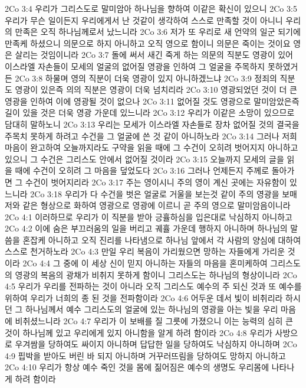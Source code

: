2Co 3:4  우리가 그리스도로 말미암아 하나님을 향하여 이같은 확신이 있으니
2Co 3:5  우리가 무슨 일이든지 우리에게서 난 것같이 생각하여 스스로 만족할 것이 아니니 우리의 만족은 오직 하나님께로서 났느니라
2Co 3:6  저가 또 우리로 새 언약의 일군 되기에 만족케 하셨으니 의문으로 하지 아니하고 오직 영으로 함이니 의문은 죽이는 것이요 영은 살리는 것임이니라
2Co 3:7  돌에 써서 새긴 죽게 하는 의문의 직분도 영광이 있어 이스라엘 자손들이 모세의 얼굴의 없어질 영광을 인하여 그 얼굴을 주목하지 못하였거든
2Co 3:8  하물며 영의 직분이 더욱 영광이 있지 아니하겠느냐
2Co 3:9  정죄의 직분도 영광이 있은즉 의의 직분은 영광이 더욱 넘치리라
2Co 3:10  영광되었던 것이 더 큰 영광을 인하여 이에 영광될 것이 없으나
2Co 3:11  없어질 것도 영광으로 말미암았은즉 길이 있을 것은 더욱 영광 가운데 있느니라
2Co 3:12  우리가 이같은 소망이 있으므로 담대히 말하노니
2Co 3:13  우리는 모세가 이스라엘 자손들로 장차 없어질 것의 결국을 주목치 못하게 하려고 수건을 그 얼굴에 쓴 것 같이 아니하노라
2Co 3:14  그러나 저희 마음이 완고하여 오늘까지라도 구약을 읽을 때에 그 수건이 오히려 벗어지지 아니하고 있으니 그 수건은 그리스도 안에서 없어질 것이라
2Co 3:15  오늘까지 모세의 글을 읽을 때에 수건이 오히려 그 마음을 덮었도다
2Co 3:16  그러나 언제든지 주께로 돌아가면 그 수건이 벗어지리라
2Co 3:17  주는 영이시니 주의 영이 계신 곳에는 자유함이 있느니라
2Co 3:18  우리가 다 수건을 벗은 얼굴로 거울을 보는것 같이 주의 영광을 보매 저와 같은 형상으로 화하여 영광으로 영광에 이르니 곧 주의 영으로 말미암음이니라
2Co 4:1  이러하므로 우리가 이 직분을 받아 긍휼하심을 입은대로 낙심하지 아니하고
2Co 4:2  이에 숨은 부끄러움의 일을 버리고 궤휼 가운데 행하지 아니하며 하나님의 말씀을 혼잡케 아니하고 오직 진리를 나타냄으로 하나님 앞에서 각 사람의 양심에 대하여 스스로 천거하노라
2Co 4:3  만일 우리 복음이 가리웠으면 망하는 자들에게 가리운 것이라
2Co 4:4  그 중에 이 세상 신이 믿지 아니하는 자들의 마음을 혼미케하여 그리스도의 영광의 복음의 광채가 비취지 못하게 함이니 그리스도는 하나님의 형상이니라
2Co 4:5  우리가 우리를 전파하는 것이 아니라 오직 그리스도 예수의 주 되신 것과 또 예수를 위하여 우리가 너희의 종 된 것을 전파함이라
2Co 4:6  어두운 데서 빛이 비취리라 하시던 그 하나님께서 예수 그리스도의 얼굴에 있는 하나님의 영광을 아는 빛을 우리 마음에 비취셨느니라
2Co 4:7  우리가 이 보배를 질 그릇에 가졌으니 이는 능력의 심히 큰 것이 하나님께 있고 우리에게 있지 아니함을 알게 하려 함이라
2Co 4:8  우리가 사방으로 우겨쌈을 당하여도 싸이지 아니하며 답답한 일을 당하여도 낙심하지 아니하며
2Co 4:9  핍박을 받아도 버린 바 되지 아니하며 거꾸러뜨림을 당하여도 망하지 아니하고
2Co 4:10  우리가 항상 예수 죽인 것을 몸에 짊어짐은 예수의 생명도 우리몸에 나타나게 하려 함이라
